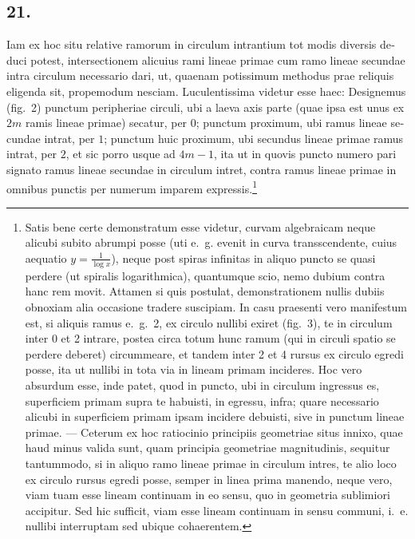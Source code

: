 \documentclass[12pt,a4paper]{article}
\begin{document}
\begin{otherlanguage}{latin}
\subsection*{21.}
Iam ex hoc situ relative ramorum in circulum intrantium tot modis diversis deduci potest, intersectionem alicuius rami lineae primae cum ramo lineae secundae intra circulum necessario dari, ut, quaenam potissimum methodus prae reliquis eligenda sit, propemodum nesciam. Luculentissima videtur esse haec: Designemus (fig.~2) punctum peripheriae circuli, ubi a laeva axis parte (quae ipsa est unus ex $2m$ ramis lineae primae) secatur, per $0$; punctum proximum, ubi ramus lineae secundae intrat, per $1$; punctum huic proximum, ubi secundus lineae primae ramus intrat, per $2$, et sic porro usque ad $4m-1$, ita ut in quovis puncto numero pari signato ramus lineae secundae in circulum intret, contra ramus lineae primae in omnibus punctis per numerum imparem expressis.\footnote{Satis bene certe demonstratum esse videtur, curvam algebraicam neque alicubi subito abrumpi posse (uti e.~g. evenit in curva transscendente, cuius aequatio $y=\frac{1}{\log x}$), neque post spiras infinitas in aliquo puncto se quasi perdere (ut spiralis logarithmica), quantumque scio, nemo dubium contra hanc rem movit. Attamen si quis postulat, demonstrationem nullis dubiis obnoxiam alia occasione tradere suscipiam. In casu praesenti vero manifestum est, si aliquis ramus e.~g.~2, ex circulo nullibi exiret (fig.~3), te in circulum inter 0 et 2 intrare, postea circa totum hunc ramum (qui in circuli spatio se perdere deberet) circummeare, et tandem inter 2 et 4 rursus ex circulo egredi posse, ita ut nullibi in tota via in lineam primam incideres. Hoc vero absurdum esse, inde patet, quod in puncto, ubi in circulum ingressus es, superficiem primam supra te habuisti, in egressu, infra; quare necessario alicubi in superficiem primam ipsam incidere debuisti, sive in punctum lineae primae. --- Ceterum ex hoc ratiocinio principiis geometriae situs innixo, quae haud minus valida sunt, quam principia geometriae magnitudinis, sequitur tantummodo, si in aliquo ramo lineae primae in circulum intres, te alio loco ex circulo rursus egredi posse, semper in linea prima manendo, neque vero, viam tuam esse lineam continuam in eo sensu, quo in geometria sublimiori accipitur. Sed hic sufficit, viam esse lineam continuam in sensu communi, i.~e. nullibi interruptam sed ubique cohaerentem.}


\end{otherlanguage}
\end{document}
